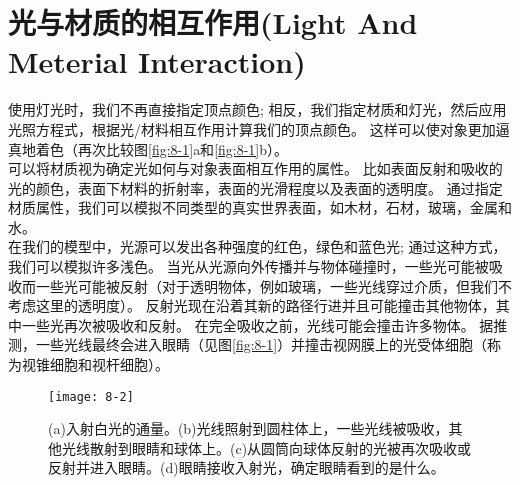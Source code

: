 \section{光与材质的相互作用(Light And Meterial Interaction)}
\begin{flushleft}
使用灯光时，我们不再直接指定顶点颜色; 相反，我们指定材质和灯光，然后应用光照方程式，根据光/材料相互作用计算我们的顶点颜色。 这样可以使对象更加逼真地着色（再次比较图\ref{fig:8-1}a和\ref{fig:8-1}b）。\\
可以将材质视为确定光如何与对象表面相互作用的属性。 比如表面反射和吸收的光的颜色，表面下材料的折射率，表面的光滑程度以及表面的透明度。 通过指定材质属性，我们可以模拟不同类型的真实世界表面，如木材，石材，玻璃，金属和水。\\
在我们的模型中，光源可以发出各种强度的红色，绿色和蓝色光; 通过这种方式，我们可以模拟许多浅色。 当光从光源向外传播并与物体碰撞时，一些光可能被吸收而一些光可能被反射（对于透明物体，例如玻璃，一些光线穿过介质，但我们不考虑这里的透明度）。 反射光现在沿着其新的路径行进并且可能撞击其他物体，其中一些光再次被吸收和反射。 在完全吸收之前，光线可能会撞击许多物体。 据推测，一些光线最终会进入眼睛（见图\ref{fig:8-1}）并撞击视网膜上的光受体细胞（称为视锥细胞和视杆细胞）。\\
\end{flushleft}

\begin{figure}[h]
    \texttt{[image: 8-2]}
    \centering
    \caption{(a)入射白光的通量。(b)光线照射到圆柱体上，一些光线被吸收，其他光线散射到眼睛和球体上。(c)从圆筒向球体反射的光被再次吸收或反射并进入眼睛。(d)眼睛接收入射光，确定眼睛看到的是什么。}
    \label{fig:8-2}
\end{figure}

